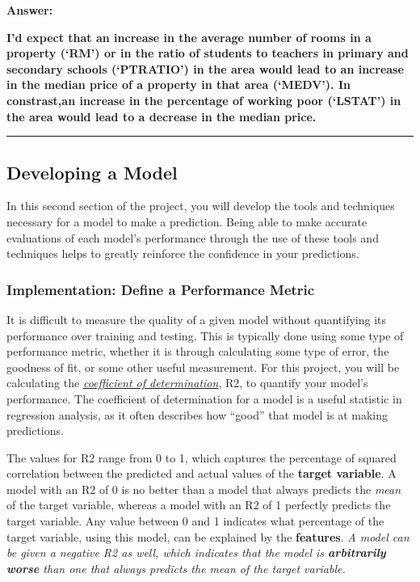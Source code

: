 \documentclass[11pt]{article}
\begin{document}
    \textbf{Answer:}

\textbf{I'd expect that an increase in the average number of rooms in a
property (`RM') or in the ratio of students to teachers in primary and
secondary schools (`PTRATIO') in the area would lead to an increase in
the median price of a property in that area (`MEDV'). In constrast,an
increase in the percentage of working poor (`LSTAT') in the area would
lead to a decrease in the median price.}

    \begin{center}\rule{0.5\linewidth}{\linethickness}\end{center}

\hypertarget{developing-a-model}{%
\subsection{Developing a Model}\label{developing-a-model}}

In this second section of the project, you will develop the tools and
techniques necessary for a model to make a prediction. Being able to
make accurate evaluations of each model's performance through the use of
these tools and techniques helps to greatly reinforce the confidence in
your predictions.

    \hypertarget{implementation-define-a-performance-metric}{%
\subsubsection{Implementation: Define a Performance
Metric}\label{implementation-define-a-performance-metric}}

It is difficult to measure the quality of a given model without
quantifying its performance over training and testing. This is typically
done using some type of performance metric, whether it is through
calculating some type of error, the goodness of fit, or some other
useful measurement. For this project, you will be calculating the
\href{http://stattrek.com/statistics/dictionary.aspx?definition=coefficient_of_determination}{\emph{coefficient
of determination}}, R2, to quantify your model's performance. The
coefficient of determination for a model is a useful statistic in
regression analysis, as it often describes how ``good'' that model is at
making predictions.

The values for R2 range from 0 to 1, which captures the percentage of
squared correlation between the predicted and actual values of the
\textbf{target variable}. A model with an R2 of 0 is no better than a
model that always predicts the \emph{mean} of the target variable,
whereas a model with an R2 of 1 perfectly predicts the target variable.
Any value between 0 and 1 indicates what percentage of the target
variable, using this model, can be explained by the \textbf{features}.
\emph{A model can be given a negative R2 as well, which indicates that
the model is \textbf{arbitrarily worse} than one that always predicts
the mean of the target variable.}
\end{document}
